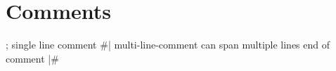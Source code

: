 
\section{Comments}

\begin{racketcode}
; single line comment
#|
multi-line-comment
can span
multiple lines
end of comment
|#
\end{racketcode}